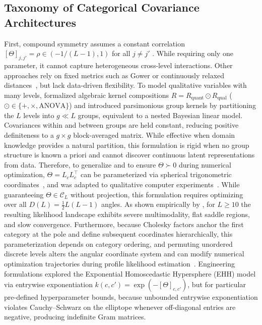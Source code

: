 \documentclass[default,sn-mathphys,Numbered]{sn-jnl}
\theoremstyle{thmstyleone}
\theoremstyle{thmstylethree}
\theoremstyle{thmstyletwo}
\begin{document}
\subsection{Taxonomy of Categorical Covariance Architectures}

First, compound symmetry assumes a constant correlation $[\Theta]_{j, j'} = \rho \in (-1/(L-1), 1)$ for all $j \neq j'$ \citep{PDUDE,carpintero2025reproducible}. While requiring only one parameter, it cannot capture heterogeneous cross-level interactions. Other approaches rely on fixed metrics such as Gower or continuously relaxed distances~\citep{Gower,GMHL}, but lack data-driven flexibility. 
To model qualitative variables with many levels, \citet{Roustant} formalized algebraic kernel compositions $R = R_{\mathrm{quant}} \odot R_{\mathrm{qual}}$ ($\odot \in \{+, \times, \mathrm{ANOVA}\}$) and introduced parsimonious group kernels by partitioning the $L$ levels into $g \ll L$ groups, equivalent to a nested Bayesian linear model. Covariances within and between groups are held constant, reducing positive definiteness to a $g \times g$ block-averaged matrix. 
While effective when domain knowledge provides a natural partition, this formulation is rigid when no group structure is known a priori and cannot discover continuous latent representations from data.
Therefore, to generalize and to ensure $\Theta \succ 0$ during numerical optimization,  $\Theta = L_c L_c^\top$ can be parameterized via spherical trigonometric coordinates~\citep{pinheiro_unconstrained_1996,HS,HS_Jacobi}, and was adapted to qualitative computer experiments~\citep{Roustant,Pelamatti}. 
While guaranteeing $\Theta \in \mathcal{C}_L$ without projection, this formulation requires optimizing over all $D(L) = \frac{1}{2}L(L-1)$ angles.
As shown empirically by \citet{carpintero2025reproducible}, for $L \ge 10$ the resulting likelihood landscape exhibits severe multimodality, flat saddle regions, and slow convergence.
Furthermore, because Cholesky factors anchor the first category at the pole and define subsequent coordinates hierarchically, this parameterization depends on category ordering, and permuting unordered discrete levels alters the angular coordinate system and can modify numerical optimization trajectories during profile likelihood estimation~\citep{li2022permutation}.
Engineering formulations explored the Exponential Homoscedastic Hypersphere (EHH) model \citep{Mixed_Paul,saves2023high} via entrywise exponentiation $k(c, c') = \exp(-[\Theta]_{c, c'})$, but for particular pre-defined hyperparameter bounds, because unbounded entrywise exponentiation violates Cauchy--Schwarz on the elliptope whenever off-diagonal entries are negative, producing indefinite Gram matrices.
\end{document}
